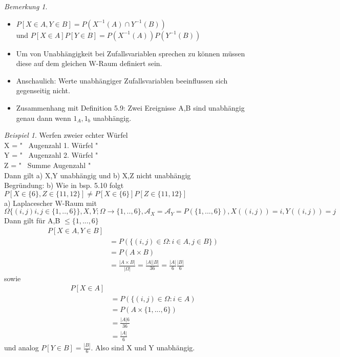 \documentclass[a4paper,12pt,fleqn]{scrartcl}
\newcommand{\m}[1]{\mathcal{ #1 }}
\theoremstyle{definition}
\theoremstyle{plain}
\theoremstyle{remark}
\newtheorem*{bemerkung}{Bemerkung}
\newtheorem{beispiel}[definition]{Beispiel}
\begin{document}
\begin{bemerkung}
\begin{itemize}
\item $ P[X \in A , Y \in B] = P(X^{-1}(A) \cap Y^{-1}(B)) $ \\
 und $ P[X \in A]P[ Y \in B ] = P(X^{-1}(A))P(Y^{-1}(B)) $
\item Um von Unabhängigkeit bei Zufallsvariablen sprechen zu können müssen diese auf dem gleichen W-Raum definiert sein.
\item Anschaulich: Werte unabhängiger Zufallsvariablen beeinflussen sich gegenseitig nicht.
\item Zusammenhang mit Definition 5.9: Zwei Ereignisse A,B sind unabhängig genau dann wenn $1_A, 1_b$ unabhängig. 
\end{itemize}
\end{bemerkung}
\begin{beispiel}
Werfen zweier echter Würfel \\
X = " \  Augenzahl 1. Würfel " \\
Y = " \  Augenzahl 2. Würfel " \\
Z = " \  Summe Augenzahl " \\
Dann gilt a) X,Y unabhängig und b) X,Z nicht unabhängig \\
Begründung: b) Wie in bsp. 5.10 folgt $P[ X \in \{ 6 \} , Z \in \{ 11 , 12 \} ] \neq P[X \in \{ 6 \} ]P[Z \in \{ 11 , 12 \} ]$ \\
a) Laplacescher W-Raum mit $ \Omega \{ ( i,j) i,j \in \{ 1,..,6 \} \} , X,Y ; \Omega \rightarrow \{ 1,..,6 \} , \m{A}_X = \m{A}_Y = P( \{ 1,...,6 \} ) , X((i,j)) = i , Y((i,j))=j$ \\
Dann gilt für A,B $\leq \{1,...,6 \} $
\begin{align*}
P[X \in A , Y \in B] \\
&= P( \{ (i,j) \in \Omega : i \in A , j \in B \} ) \\
&= P( A \times B ) \\
&= \frac{| A \times B |}{| \Omega  |} = \frac{|A| |B|}{36} = \frac{|A|}{6} \frac{|B|}{6}
\end{align*} 
sowie 
\begin{align*}
P[X \in A] \\
&= P( \{ (i,j) \in \Omega : i \in A ) \\
&= P( A \times \{ 1,...,6 \} ) \\
&= \frac{|A| 6}{36} \\
&= \frac{|A|}{6}
\end{align*}
und analog $P[Y \in B] = \frac{|B|}{6}$. Also sind X und Y unabhängig.
\end{beispiel}
\end{document}
